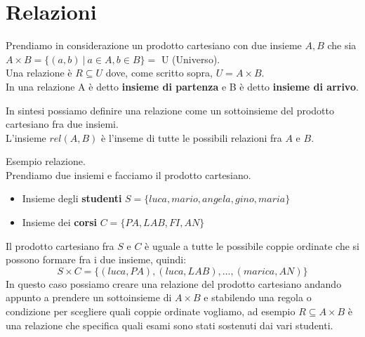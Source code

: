 \newpage
\section{Relazioni}
\begin{definition}[Relazione]
	\label{def:relazione}
	Prendiamo in considerazione un prodotto cartesiano con due insieme $A, B$ che sia $A \times B = \{(a,b) \: | \: a \in A, b \in B\} = $ U (Universo). 
	\\
	Una relazione è $R \subseteq U$ dove, come scritto sopra, $U = A \times B$.
	\\
	In una relazione A è detto \textbf{insieme di partenza} e B è detto \textbf{insieme di arrivo}.
\end{definition}

\hspace{-15pt}
In sintesi possiamo definire una relazione come un sottoinsieme del prodotto cartesiano fra due insiemi.
\\
L'insieme $rel(A,B)$ è l'inseme di tutte le possibili relazioni fra $A$ e $B$.
\begin{example}
    Esempio relazione.\\
    Prendiamo due insiemi e facciamo il prodotto cartesiano.
    \begin{itemize}
    	\item Insieme degli \textbf{studenti} $S = \{luca, mario, angela, gino, maria\}$
    	\item Insieme dei \textbf{corsi} $C = \{PA, LAB, FI, AN\}$
    \end{itemize}
    Il prodotto cartesiano fra $S$ e $C$ è uguale a tutte le possibile coppie ordinate che si possono formare fra i due insieme, quindi:
    \begin{equation}
    	S \times C = \{(luca, PA), (luca, LAB), ..., (marica, AN)\}
    \end{equation}
    In questo caso possiamo creare una relazione del prodotto cartesiano andando appunto a prendere un sottoinsieme di $A \times B$ e stabilendo una regola o condizione per scegliere quali coppie ordinate vogliamo, ad esempio $R \subseteq A \times B$ è una relazione che specifica quali esami sono stati sostenuti dai vari studenti.
\end{example}

